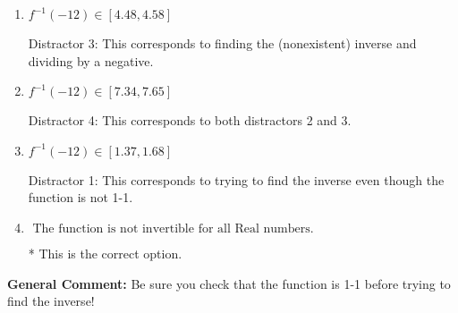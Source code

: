 \documentclass{extbook}[14pt]
\begin{document}
\begin{enumerate}
{\begin{enumerate}[label=\Alph*.]
 Distractor 2: This corresponds to finding the (nonexistent) inverse and not subtracting by the vertical shift.
\item \( f^{-1}(-12) \in [4.48, 4.58] \)

 Distractor 3: This corresponds to finding the (nonexistent) inverse and dividing by a negative.
\item \( f^{-1}(-12) \in [7.34, 7.65] \)

 Distractor 4: This corresponds to both distractors 2 and 3.
\item \( f^{-1}(-12) \in [1.37, 1.68] \)

 Distractor 1: This corresponds to trying to find the inverse even though the function is not 1-1. 
\item \( \text{ The function is not invertible for all Real numbers. } \)

* This is the correct option.
\end{enumerate}

\textbf{General Comment:} Be sure you check that the function is 1-1 before trying to find the inverse!
}
\end{enumerate}
\end{document}
